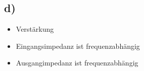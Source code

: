 \subsection*{d)}

\begin{itemize}
	\item Verstärkung
	\item Eingangsimpedanz ist frequenzabhängig
	\item Ausgangimpedanz ist frequenzabhängig
\end{itemize}



















